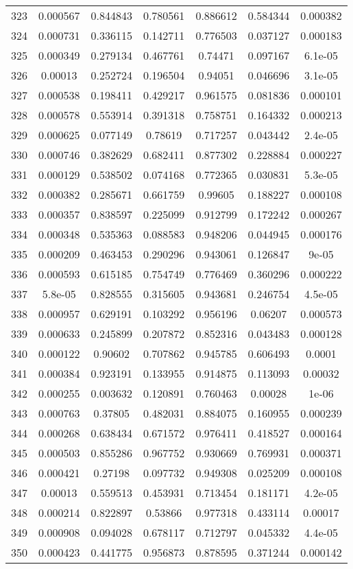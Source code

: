 \begin{table}
\begin{tabular}{c|c|c|c|c|c|c}
323 & 0.000567 & 0.844843 & 0.780561 & 0.886612 & 0.584344 & 0.000382\\
324 & 0.000731 & 0.336115 & 0.142711 & 0.776503 & 0.037127 & 0.000183\\
325 & 0.000349 & 0.279134 & 0.467761 & 0.74471 & 0.097167 & 6.1e-05\\
326 & 0.00013 & 0.252724 & 0.196504 & 0.94051 & 0.046696 & 3.1e-05\\
327 & 0.000538 & 0.198411 & 0.429217 & 0.961575 & 0.081836 & 0.000101\\
328 & 0.000578 & 0.553914 & 0.391318 & 0.758751 & 0.164332 & 0.000213\\
329 & 0.000625 & 0.077149 & 0.78619 & 0.717257 & 0.043442 & 2.4e-05\\
330 & 0.000746 & 0.382629 & 0.682411 & 0.877302 & 0.228884 & 0.000227\\
331 & 0.000129 & 0.538502 & 0.074168 & 0.772365 & 0.030831 & 5.3e-05\\
332 & 0.000382 & 0.285671 & 0.661759 & 0.99605 & 0.188227 & 0.000108\\
333 & 0.000357 & 0.838597 & 0.225099 & 0.912799 & 0.172242 & 0.000267\\
334 & 0.000348 & 0.535363 & 0.088583 & 0.948206 & 0.044945 & 0.000176\\
335 & 0.000209 & 0.463453 & 0.290296 & 0.943061 & 0.126847 & 9e-05\\
336 & 0.000593 & 0.615185 & 0.754749 & 0.776469 & 0.360296 & 0.000222\\
337 & 5.8e-05 & 0.828555 & 0.315605 & 0.943681 & 0.246754 & 4.5e-05\\
338 & 0.000957 & 0.629191 & 0.103292 & 0.956196 & 0.06207 & 0.000573\\
339 & 0.000633 & 0.245899 & 0.207872 & 0.852316 & 0.043483 & 0.000128\\
340 & 0.000122 & 0.90602 & 0.707862 & 0.945785 & 0.606493 & 0.0001\\
341 & 0.000384 & 0.923191 & 0.133955 & 0.914875 & 0.113093 & 0.00032\\
342 & 0.000255 & 0.003632 & 0.120891 & 0.760463 & 0.00028 & 1e-06\\
343 & 0.000763 & 0.37805 & 0.482031 & 0.884075 & 0.160955 & 0.000239\\
344 & 0.000268 & 0.638434 & 0.671572 & 0.976411 & 0.418527 & 0.000164\\
345 & 0.000503 & 0.855286 & 0.967752 & 0.930669 & 0.769931 & 0.000371\\
346 & 0.000421 & 0.27198 & 0.097732 & 0.949308 & 0.025209 & 0.000108\\
347 & 0.00013 & 0.559513 & 0.453931 & 0.713454 & 0.181171 & 4.2e-05\\
348 & 0.000214 & 0.822897 & 0.53866 & 0.977318 & 0.433114 & 0.00017\\
349 & 0.000908 & 0.094028 & 0.678117 & 0.712797 & 0.045332 & 4.4e-05\\
350 & 0.000423 & 0.441775 & 0.956873 & 0.878595 & 0.371244 & 0.000142\\
\end{tabular}
\end{table}
